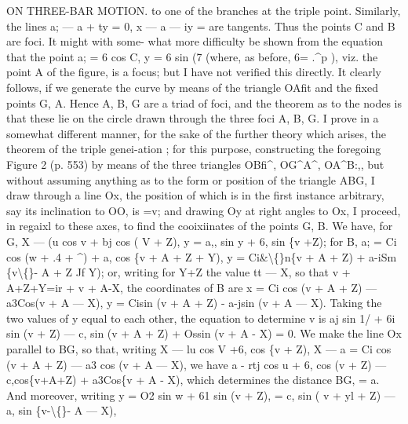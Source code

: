 \documentclass[11pt,a4paper]{book}
\begin{document}
ON THREE-BAR MOTION.
to
one
of
the
branches
at
the
triple
point.
Similarly,
the
lines
a; --- a + ty = 0,
x --- a --- iy =
are
tangents.
Thus
the
points C and B
are
foci.
It
might with
some-
what more
difficulty be
shown
from
the
equation
that the
point
a; = 6 cos C, y = 6 sin (7
(where, as
before, 6=
.\textasciicircum{}p
),
viz.
the
point A
of the
figure,
is
a
focus;
but
I
have
not
verified
this
directly.
It clearly
follows,
if we generate the
curve by means
of
the
triangle
OAfit
and
the
fixed
points
G, A.
Hence
A,
B, G
are
a
triad
of
foci,
and
the
theorem
as
to
the
nodes
is
that
these
lie
on the
circle drawn through the three
foci A, B,
G.
I
prove
in
a somewhat different manner,
for
the sake of
the
further theory which
arises, the
theorem
of the
triple genei-ation
;
for
this
purpose, constructing the foregoing
Figure
2
(p.
553)
by means
of
the
three
triangles
OBfi\textasciicircum{},
OG\textasciicircum{}A\textasciicircum{},
OA\textasciicircum{}B:,, but
without
assuming
anything
as
to
the
form
or
position
of
the
triangle ABG,
I
draw
through
a
line
Ox, the
position
of which
is
in the
first instance arbitrary, say
its inclination
to
OO,
is =v;
and
drawing
Oy at
right
angles
to
Ox,
I
proceed,
in
regaixl
to
these
axes,
to
find
the
cooixiinates of the points
G, B.
We
have,
for
G,
X --- (u cos v + bj cos ( V + Z),
y = a,, sin y + 6, sin \{v +Z);
for B,
a; = Ci cos (w + .4 + \textasciicircum{}) + a, cos \{v + A + Z + Y),
y = Ci\&\textbackslash\{\}n\{v + A + Z) + a-iSm \{v\textbackslash\{\}- A + Z Jf Y);
or, writing
for Y+Z the value
tt --- X, so that
v + A+Z+Y=ir + v + A-X,
the coordinates of B are
x = Ci cos (v + A + Z) --- a3Cos(v + A --- X),
y = Cisin (v + A + Z) - a-jsin (v + A --- X).
Taking the two
values
of y equal
to
each
other, the equation
to determine
v
is
aj sin
1/ + 6i sin (v + Z) --- c, sin (v + A + Z) + Ossin (v + A - X) = 0.
We make the
line Ox parallel
to BG, so
that, writing
X --- lu cos V
+6, cos \{v + Z),
X --- a = Ci cos (v + A + Z) --- a3 cos (v + A --- X),
we have
a - rtj cos u + 6, cos (v + Z) --- c,cos\{v+A+Z) + a3Cos\{v + A - X),
which determines the distance BG, = a.
And moreover,
writing
y = O2 sin w
+ 61 sin (v + Z),
= c, sin ( v + yl + Z) --- a, sin \{v-\textbackslash\{\}- A --- X),
\end{document}
